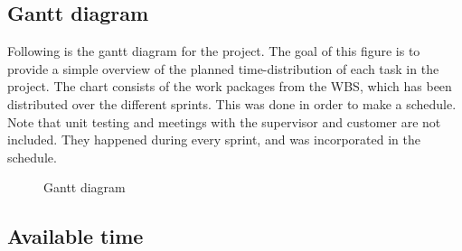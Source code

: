 \subsection{Gantt diagram}

Following is the gantt diagram for the project. The goal of this figure is to provide a simple overview of the planned time-distribution of each task in the project. The chart consists of the work packages from the WBS, which has been distributed over the different sprints. This was done in order to make a schedule. Note that unit testing and meetings with the supervisor and customer are not included. They happened during every sprint, and was incorporated in the schedule.

\begin{center}
  \begin{figure}[ht!]
    \caption{Gantt diagram}
    \label{fig:gantt}
  \end{figure}
\end{center}

\clearpage

\subsection{Available time}


